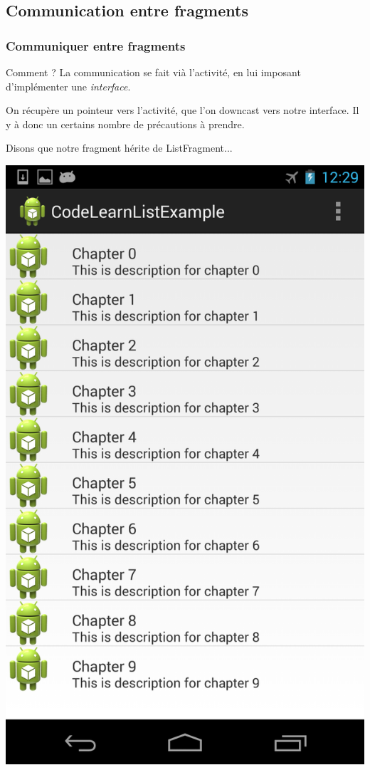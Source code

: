 \documentclass{beamer}
\begin{document}
\subsection{Communication entre fragments}

\begin{frame}
\frametitle{Communiquer entre fragments}
\begin{block}{Comment ?}
La communication se fait vià l'activité, en lui imposant d'implémenter une \emph{interface}.
\end{block}
\pause
\begin{block}{}
On récupère un pointeur vers l'activité, que l'on downcast vers notre interface. Il y à donc un certains nombre de précautions à prendre.
\end{block}
\end{frame}

\begin{frame}
  \begin{block}{Disons que notre fragment hérite de ListFragment...}
    \begin{center}
      \includegraphics[scale=0.15]{listview.png}
    \end{center}
  \end{block}
\end{frame}
\end{document}
